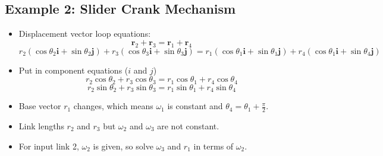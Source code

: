 \documentclass[11pt]{article}
\begin{document}
\subsection{Example 2: Slider Crank Mechanism}
\label{sec:org7af8ad6}
\begin{itemize}
\item Displacement vector loop equations:
\[\boldsymbol{r}_2 + \boldsymbol{r}_3 = \boldsymbol{r}_1 + \boldsymbol{r}_4\]
\[r_2 (\cos \theta_2 \boldsymbol{i} + \sin \theta_2 \boldsymbol{j}) + r_3 (\cos \theta_3 \boldsymbol{i} + \sin \theta_3 \boldsymbol{j}) = r_1 (\cos \theta_1 \boldsymbol{i} + \sin \theta_1 \boldsymbol{j}) + r_4 (\cos \theta_1 \boldsymbol{i} + \sin \theta_4 \boldsymbol{j})\]
\item Put in component equations (\(i\) and \(j\))
\[r_2 \cos \theta_2 + r_3 \cos \theta_3 = r_1 \cos \theta_1 + r_4 \cos \theta_4\]
\[r_2 \sin \theta_2 + r_3 \sin \theta_3 = r_1 \sin \theta_1 + r_4 \sin \theta_4\]
\item Base vector \(r_1\) changes, which means \(\omega_1\) is constant and \(\theta_4 = \theta_1 + \frac{\pi}{2}\).
\item Link lengths \(r_2\) and \(r_3\) but \(\omega_2\) and \(\omega_3\) are not constant.
\item For input link 2, \(\omega_2\) is given, so solve \(\omega_3\) and \(r_1\) in terms of \(\omega_2\).
\end{itemize}

 \newpage
\end{document}
